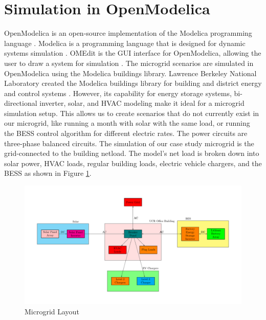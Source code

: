 \documentclass[conference]{IEEEtran}
\begin{document}
\section{Simulation in OpenModelica}
    	OpenModelica is an open-source implementation of the Modelica programming language \cite{OpenModelica}. Modelica is a programming language that is designed for dynamic systems simulation \cite{ModelicaLanguage}. OMEdit is the GUI interface for OpenModelica, allowing the user to draw a system for simulation \cite{OMEdit}. The microgrid scenarios are simulated in OpenModelica using the Modelica buildings library.  Lawrence Berkeley National Laboratory created the Modelica buildings library for building and district energy and control systems \cite{ModelicaBuildingsLibrary}. However, its capability for energy storage systems, bi-directional inverter, solar, and HVAC modeling make it ideal for a microgrid simulation setup. This allows us to create scenarios that do not currently exist in our microgrid, like running a month with solar with the same load, or running the BESS control algorithm for different electric rates.  The power circuits are three-phase balanced circuits. The simulation of our case study microgrid is the grid-connected to the building netload. The model's net load is broken down into solar power, HVAC loads, regular building loads, electric vehicle chargers, and the BESS as shown in Figure \ref{fig:powersystemsetupfull}.
	\begin{figure}[H]
		\centering
		\includegraphics[width=1\linewidth]{Fig/power_system_setup_modelica}
		\caption{Microgrid Layout}
		\label{fig:powersystemsetupfull}
	\end{figure}
\end{document}
